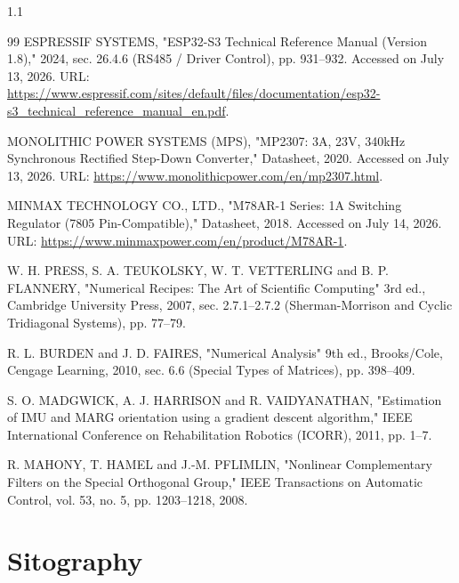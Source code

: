 \documentclass{tropLaClasse}
\begin{document}
\begin{spacing}{1.1}
\begin{thebibliography}{99}
 ESPRESSIF SYSTEMS, "ESP32-S3 Technical Reference Manual (Version 1.8)," 2024, sec. 26.4.6 (RS485 / Driver Control), pp. 931--932. Accessed on July 13, 2026. URL: \url{https://www.espressif.com/sites/default/files/documentation/esp32-s3_technical_reference_manual_en.pdf}.

 MONOLITHIC POWER SYSTEMS (MPS), "MP2307: 3A, 23V, 340kHz Synchronous Rectified Step-Down Converter," Datasheet, 2020. Accessed on July 13, 2026. URL: \url{https://www.monolithicpower.com/en/mp2307.html}.

 MINMAX TECHNOLOGY CO., LTD., "M78AR-1 Series: 1A Switching Regulator (7805 Pin-Compatible)," Datasheet, 2018. Accessed on July 14, 2026. URL: \url{https://www.minmaxpower.com/en/product/M78AR-1}.

 W. H. PRESS, S. A. TEUKOLSKY, W. T. VETTERLING and B. P. FLANNERY, "Numerical Recipes: The Art of Scientific Computing" 3rd ed., Cambridge University Press, 2007, sec. 2.7.1--2.7.2 (Sherman-Morrison and Cyclic Tridiagonal Systems), pp. 77--79.

 R. L. BURDEN and J. D. FAIRES, "Numerical Analysis" 9th ed., Brooks/Cole, Cengage Learning, 2010, sec. 6.6 (Special Types of Matrices), pp. 398--409.

 S. O. MADGWICK, A. J. HARRISON and R. VAIDYANATHAN, "Estimation of IMU and MARG orientation using a gradient descent algorithm," IEEE International Conference on Rehabilitation Robotics (ICORR), 2011, pp. 1--7.

 R. MAHONY, T. HAMEL and J.-M. PFLIMLIN, "Nonlinear Complementary Filters on the Special Orthogonal Group," IEEE Transactions on Automatic Control, vol. 53, no. 5, pp. 1203--1218, 2008.

\end{thebibliography}
\end{spacing}

\vspace{-0.5cm}

\section*{Sitography}
\end{document}
